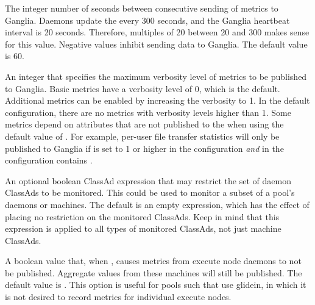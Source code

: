 \begin{description}

\label{param:GangliadInterval}
\item[\Macro{GANGLIAD\_INTERVAL}]
  The integer number of seconds between consecutive sending 
  of metrics to Ganglia.
  Daemons update the  every 300 seconds,
  and the Ganglia heartbeat interval is 20 seconds. 
  Therefore, multiples of 20 between 20 and 300 makes sense for this value.
  Negative values inhibit sending data to Ganglia.
  The default value is 60.

\label{param:GangliadVerbosity}
\item[\Macro{GANGLIAD\_VERBOSITY}] An integer that specifies the
  maximum verbosity level of metrics to be published to Ganglia.
  Basic metrics have a verbosity level of 0, which is the default.
  Additional metrics can be enabled by increasing the verbosity to 1.
  In the default configuration, there are no metrics with verbosity
  levels higher than 1.  Some metrics depend on attributes that are
  not published to the  when using the default value of
  .  For example, per-user file
  transfer statistics will only be published to Ganglia if
   is set to 1 or higher in the
   configuration \emph{and}
   in the  configuration
  contains .

\label{param:GangliadRequirements}
\item[\Macro{GANGLIAD\_REQUIREMENTS}] An optional boolean ClassAd expression
  that may restrict the set of daemon ClassAds to be monitored.  This could be
  used to monitor a subset of a pool's daemons or machines.
  The default is an empty expression, 
  which has the effect of placing no restriction on the monitored ClassAds. 
  Keep in mind that this expression is applied to
  all types of monitored ClassAds, not just machine ClassAds.

\label{param:GangliadPerExecuteNodeMetrics}
\item[\Macro{GANGLIAD\_PER\_EXECUTE\_NODE\_METRICS}] 
  A boolean value that, when ,
  causes metrics from execute node daemons to not be published.
  Aggregate values from these machines will still be published.  
  The default value is .  
  This option is useful for pools such that use glidein, 
  in which it is not desired to record metrics for individual execute nodes.


\end{description}
